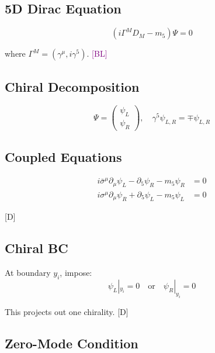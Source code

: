 \documentclass[11pt,a4paper]{article}
\newcommand{\tagD}{\textcolor{blue!70!black}{[D]}}
\newcommand{\tagBL}{\textcolor{purple}{[BL]}}
\begin{document}
\subsection{5D Dirac Equation}

\begin{equation}
\label{eq:app-dirac}
(i\Gamma^M D_M - m_5) \Psi = 0
\end{equation}

where $\Gamma^M = (\gamma^\mu, i\gamma^5)$. \tagBL

\subsection{Chiral Decomposition}

\begin{equation}
\label{eq:app-chiral}
\Psi = \begin{pmatrix} \psi_L \\ \psi_R \end{pmatrix}, \quad \gamma^5 \psi_{L,R} = \mp \psi_{L,R}
\end{equation}

\subsection{Coupled Equations}

\begin{align}
\label{eq:app-ferm-L}
i\bar{\sigma}^\mu \partial_\mu \psi_L - \partial_5 \psi_R - m_5 \psi_R &= 0 \\
\label{eq:app-ferm-R}
i\sigma^\mu \partial_\mu \psi_R + \partial_5 \psi_L - m_5 \psi_L &= 0
\end{align}

\tagD

\subsection{Chiral BC}

At boundary $y_i$, impose:
\begin{equation}
\label{eq:app-chiral-bc}
\psi_L|_{y_i} = 0 \quad \text{or} \quad \psi_R|_{y_i} = 0
\end{equation}

This projects out one chirality. \tagD

\subsection{Zero-Mode Condition}
\end{document}
